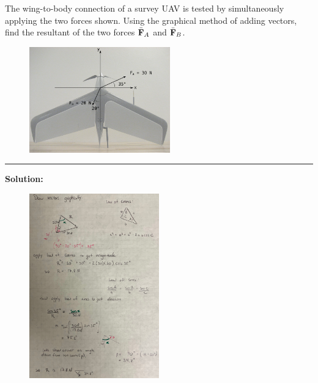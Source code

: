 
The wing-to-body connection of a survey UAV is tested by simultaneously applying the two forces shown.  Using the graphical method of adding vectors, find the resultant of the two forces $\bar{\bf F}_A$ and $\bar{\bf F}_B$.

\begin{figure}[ht!]
  \centering
  \includegraphics[height=1.8in]{2016-aem-uav-topview.png}
\end{figure}

\vspace{.5cm}
\rule{\textwidth}{.4pt}
\vspace{.5cm}
\textbf{Solution:}
\begin{figure}[ht!]
  \centering
  \includegraphics[width=0.5\textwidth]{soln.png}
\end{figure}

